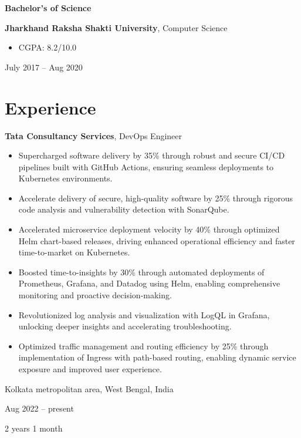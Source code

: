 \documentclass[10pt, letterpaper]{article}
\newenvironment{highlights}{
    \begin{itemize}[
        topsep=0.10 cm,
        parsep=0.10 cm,
        partopsep=0pt,
        itemsep=0pt,
        leftmargin=0.4 cm + 10pt
    ]
}{
    \end{itemize}
} %
\newenvironment{twocolentry}[2][]{
    \onecolentry
    \def\secondColumn{#2}
    \setcolumnwidth{\fill, 4.5 cm}
    \begin{paracol}{2}
}{
    \switchcolumn \raggedleft \secondColumn
    \end{paracol}
    \endonecolentry
} %
\newenvironment{threecolentry}[3][]{
    \onecolentry
    \def\thirdColumn{#3}
    \setcolumnwidth{1 cm, \fill, 4.5 cm}
    \begin{paracol}{3}
    {\raggedright #2} \switchcolumn
}{
    \switchcolumn \raggedleft \thirdColumn
    \end{paracol}
    \endonecolentry
} %
\begin{document}
        
        \begin{threecolentry}{\textbf{Bachelor's of Science}}{
            July 2017 – Aug 2020
        }
            \textbf{Jharkhand Raksha Shakti University}, Computer Science
            \begin{highlights}
                \item CGPA: 8.2/10.0
            \end{highlights}
        \end{threecolentry}


    
    \section{Experience}



        
        \begin{twocolentry}{
            Kolkata metropolitan area, West Bengal, India

        Aug 2022 – present

        2 years 1 month
        }
            \textbf{Tata Consultancy Services}, DevOps Engineer
            \begin{highlights}
                \item Supercharged software delivery by 35\% through robust and secure CI/CD pipelines built with GitHub Actions, ensuring seamless deployments to Kubernetes environments.
                \item Accelerate delivery of secure, high-quality software by 25\% through rigorous code analysis and vulnerability detection with SonarQube.
                \item Accelerated microservice deployment velocity by 40\% through optimized Helm chart-based releases, driving enhanced operational efficiency and faster time-to-market on Kubernetes.
                \item Boosted time-to-insights by 30\% through automated deployments of Prometheus, Grafana, and Datadog using Helm, enabling comprehensive monitoring and proactive decision-making.
                \item Revolutionized log analysis and visualization with LogQL in Grafana, unlocking deeper insights and accelerating troubleshooting.
                \item Optimized traffic management and routing efficiency by 25\% through implementation of Ingress with path-based routing, enabling dynamic service exposure and improved user experience.
            \end{highlights}
        \end{twocolentry}
\end{document}
